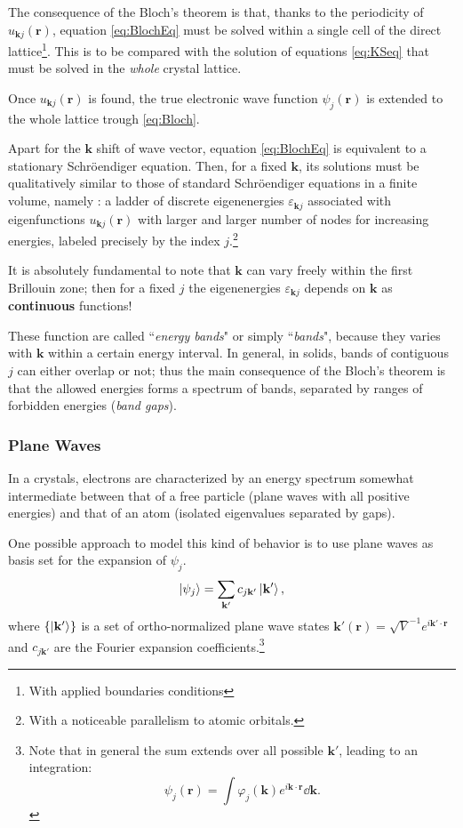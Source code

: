 \documentclass[a4paper,12pt]{article}
\newcommand\mf[1]{\mathbf{#1}}
\newcommand\erre{\mathbf{r}}
\begin{document}
The consequence of the Bloch's theorem is that, thanks to the periodicity of $u_{\mf{k}j}(\erre)$, equation \eqref{eq:BlochEq} must be solved within a single cell of the direct lattice\footnote{With applied boundaries conditions}.
This is to be compared with the solution of equations \eqref{eq:KSeq} that must be solved in the \textit{whole} crystal lattice.

Once $u_{\mf{k}j}(\erre)$ is found, the true electronic wave function $\psi_j(\erre)$ is extended to the whole lattice trough \eqref{eq:Bloch}.

Apart for the $\mf{k}$ shift of wave vector, equation \eqref{eq:BlochEq} is equivalent to a stationary Schr\"oendiger equation. Then, for a fixed $\mf{k}$, its solutions must be qualitatively similar to those of standard Schr\"oendiger equations in a finite volume, namely : a ladder of discrete eigenenergies $\varepsilon_{\mf{k}j}$ associated with eigenfunctions $u_{\mf{k}j}(\erre)$ with larger and larger number of nodes for increasing energies, labeled precisely by the index $j$.\footnote{With a noticeable parallelism to atomic orbitals.}

It is absolutely fundamental to note that $\mf{k}$ can vary freely within the first Brillouin zone; 
then for a fixed $j$ the eigenenergies $\varepsilon_{\mf{k}j}$ depends on $\mf{k}$ as \textbf{continuous} functions!

These function are called ``\textit{energy bands}" or simply ``\textit{bands}", because they varies with $\mf{k}$ within a certain energy interval. 
In general, in solids, bands of contiguous $j$ can either overlap or not; 
thus the main consequence of the Bloch's theorem is that the allowed energies forms a spectrum of bands, separated by ranges of forbidden energies (\textit{band gaps}).

\subsubsection{Plane Waves}
In a crystals, electrons are characterized by an energy spectrum somewhat intermediate between that of a free particle (plane waves with all positive energies) and that of an atom (isolated eigenvalues separated by gaps).

One possible approach to model this kind of behavior is to use plane waves as basis set for the expansion of $\psi_{j}$.
\begin{equation}\label{eq:PWExpansion}
	\ket{\psi_j}  = \sum_{\mf{k}'} c_{j\mf{k}'} \ket{\mf{k}'},
\end{equation}
where $\{\ket{\mf{k}'}\}$ is a set of ortho-normalized plane wave states $\mathbf{k'}(\erre) = \sqrt{V}^{-1} e^{i\mf{k'}\cdot\erre}$ and $c_{j\mf{k}'}$ are the Fourier expansion coefficients.\footnote{Note that in general the sum extends over all possible $\mf{k}'$, leading to an integration:
\begin{equation}
	\psi_j(\erre) = \int \varphi_j(\mf{k}) e^{i\mf{k} \cdot \erre} \dd{\mf{k}}.
\end{equation}
}
\end{document}
